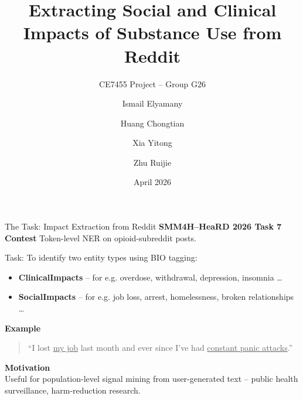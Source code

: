 \documentclass[aspectratio=169,10pt]{beamer}
\title{Extracting Social and Clinical Impacts of Substance Use from Reddit}
\subtitle{CE7455 Project -- Group G26}
\author{Ismail Elyamany \and Huang Chongtian \and Xia Yitong \and Zhu Ruijie}
\institute{Nanyang Technological University}
\date{April 2026}
\begin{document}
\begin{frame}[plain]
  \titlepage
\end{frame}

\begin{frame}{The Task: Impact Extraction from Reddit}
  \textbf{SMM4H--HeaRD 2026 Task 7 Contest } Token-level NER on opioid-subreddit posts.
  \medskip

  Task: To identify two entity types using BIO tagging:
  \begin{itemize}
    \item \textcolor{brand}{\textbf{ClinicalImpacts}} -- for e.g. overdose, withdrawal, depression, insomnia \ldots
    \item \textcolor{accent}{\textbf{SocialImpacts}} -- for e.g. job loss, arrest, homelessness, broken relationships \ldots
  \end{itemize}

  \medskip
  \textbf{Example}
  \begin{quote}\small
    ``I lost \textcolor{accent}{\underline{my job}} last month and ever since I've had
    \textcolor{brand}{\underline{constant panic attacks}}.''
  \end{quote}

  \vfill
  \textbf{Motivation} \\Useful for population-level signal mining from user-generated text -- public health surveillance, harm-reduction research.
\end{frame}
\end{document}
